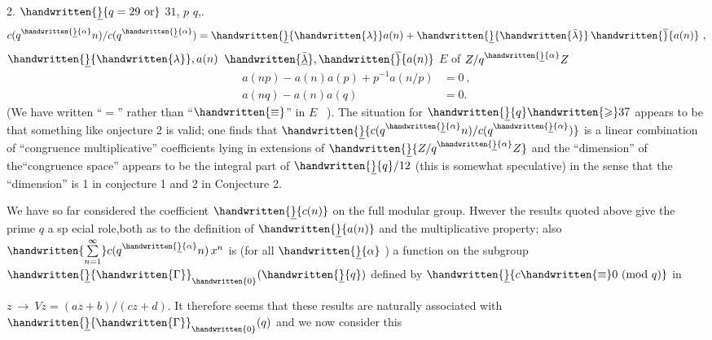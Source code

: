  2. \quad {} $\handwritten{\underline}{q=29\ \text{or}}$ $31$, $p$  $q$,. 
\[
c(q^{\handwritten{\underline}{\alpha}}n)/c(q^{\handwritten{\underline}{\alpha}})=\handwritten{\underline}{\handwritten{\lambda}}a(n)+\handwritten{\underline}{\handwritten{\bar{\lambda}}}\,\handwritten{\overline}{a(n)}\ ,
\]
$\handwritten{\underline}{\handwritten{\lambda}},a(n)$ $\handwritten{\underline{\bar{\lambda}}},\handwritten{\overline}{a(n)}$  $E$ of $Z/q^{\handwritten{\underline}{\alpha}}Z$ 
\[
\begin{aligned}
a(np)-a(n)a(p)+p^{-1}a(n/p)&=0\ ,\\
a(nq)-a(n)a(q)&=0.
\end{aligned}
\]
\margin{\handwritten{\#}}
(We have written ``$=$'' rather than ``$\handwritten{\equiv}$'' in $E$ \ ). The situation for $\handwritten{\underline}{q}\handwritten{\geqslant}37$ appears to be that something like onjecture 2 is valid; one finds that $\handwritten{\underline}{c(q^{\handwritten{\underline}{\alpha}}n)/c(q^{\handwritten{\underline}{\alpha}})}$ is a linear combination of ``congruence multiplicative'' coefficients lying in extensions of $\handwritten{\underline}{Z/q^{\handwritten{\underline}{\alpha}}Z}$ and the ``dimension'' of the``congruence space'' appears to be the integral part of $\handwritten{\underline}{q}/12$ (this is somewhat speculative) in the sense that the ``dimension'' is 1 in conjecture 1 and 2 in Conjecture 2.

We have so far considered the coefficient $\handwritten{\underline}{c(n)}$ on the full modular group. Hwever the results quoted above give the prime $q$ a sp ecial role,both as to the definition of $\handwritten{\underline}{a(n)}$ and the multiplicative property; also $\handwritten{\sum\limits_{n=1}^{\infty}}c(q^{\handwritten{\underline}{\alpha}}n)\,x^{n}$ is (for all $\handwritten{\underline}{\alpha}$ ) a function on the subgroup $\handwritten{\underline}{\handwritten{\Gamma}}_{\handwritten{0}}(\handwritten{\underline}{q})$ defined by $\handwritten{\underline}{c\handwritten{\equiv}0\ (\mathrm{mod}\ q)}$ in

$z\ \rightarrow\ Vz=(az+b)/(cz+d)$. It therefore seems that these results are naturally associated with $\handwritten{\underline}{\handwritten{\Gamma}}_{\handwritten{0}}(q)$ and we now consider this

